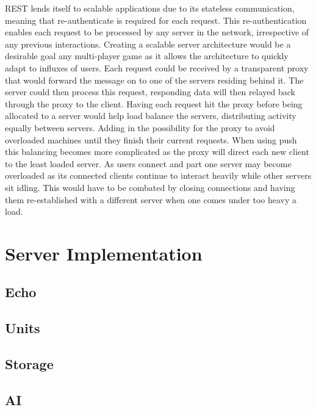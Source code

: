 REST lends itself to scalable applications due to its stateless communication, meaning that re-authenticate is required for each request. This re-authentication enables each request to be processed by any server in the network, irrespective of any previous interactions. Creating a scalable server architecture would be a desirable goal any multi-player game as it allows the architecture to quickly adapt to influxes of users. Each request could be received by a transparent proxy that would forward the message on to one of the servers residing behind it. The server could then process this request, responding data will then relayed back through the proxy to the client. Having each request hit the proxy before being allocated to a server would help load balance the servers, distributing activity equally between servers. Adding in the possibility for the proxy to avoid overloaded machines until they finish their current requests. When using push this balancing becomes more complicated as the proxy will direct each new client to the least loaded server. As users connect and part one server may become overloaded as its connected clients continue to interact heavily while other servers sit idling. This would have to be combated by closing connections and having them re-established with a different server when one comes under too heavy a load.




\section{Server Implementation}

\subsection{Echo}

\subsection{Units}

\subsection{Storage}

\subsection{AI}
